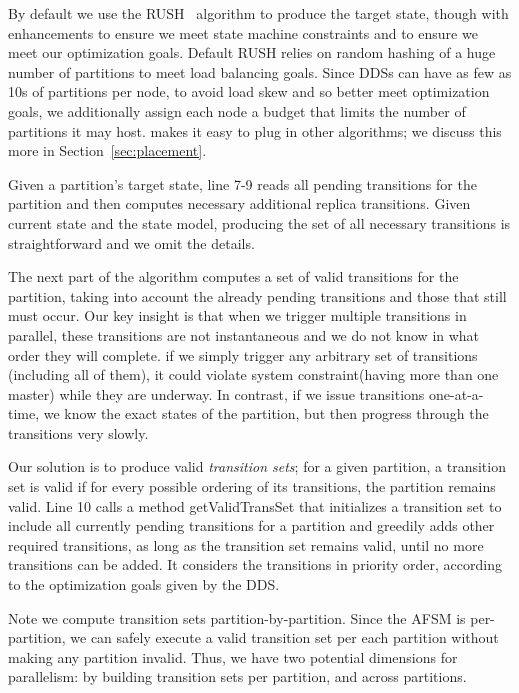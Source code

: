 By default we use the RUSH~\cite{honicky04} algorithm to produce the target state,
though with enhancements to ensure we meet state machine constraints and to
ensure we meet our optimization goals.  Default RUSH relies on
random hashing of a huge number of partitions to meet load balancing goals.
Since DDSs can have as few as 10s of partitions per node, to avoid load skew and
so better meet optimization goals, we
additionally assign each node a budget that limits the number of partitions it
may host.  \helix makes it easy to plug in other algorithms; we
discuss this more in Section~\ref{sec:placement}.

Given a partition's target state, line 7-9 reads all pending transitions for the
partition and then computes necessary additional replica transitions.
Given current state and the state model, producing the set of all necessary
transitions is straightforward
and we omit the details.

The next part of the algorithm computes a set of valid transitions for the
partition, taking into account the already pending transitions and those that
still must occur.  Our key insight is that when we trigger multiple transitions
in parallel, these transitions are not instantaneous and we do not know in what
order they will complete.  if we simply trigger any arbitrary
set of transitions (including all of them), it could violate system
constraint(\eg having more than one master) while they are underway.  In
contrast, if we issue transitions one-at-a-time, we know the exact states of the partition, but then progress through the transitions very slowly.

Our solution is to produce valid \emph{transition sets}; for a given
partition, a transition set is valid if
for every possible ordering of its transitions, the partition remains valid.    
Line 10 calls a method getValidTransSet that initializes a
transition set to include all
currently pending transitions for a partition and greedily adds other required
transitions, as long as the transition set remains valid, until no more
transitions can be added.  It considers the transitions in priority order,
according to the optimization goals given by the DDS.

Note we compute transition sets partition-by-partition.  Since the AFSM is
per-partition, we can safely execute a valid transition set per each partition
without making any partition invalid.  Thus, we have two potential dimensions for
parallelism: by building transition sets per partition, and across partitions.

